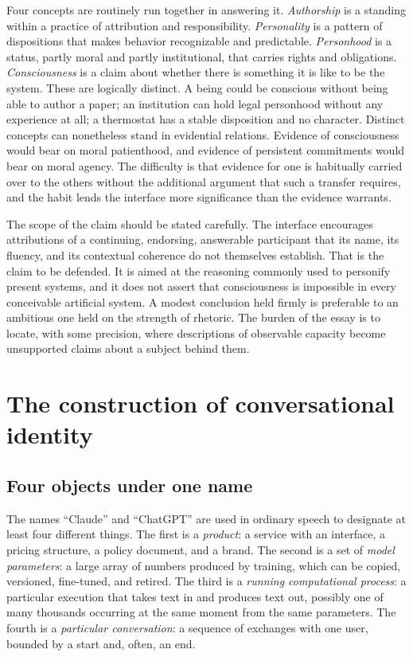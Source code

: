 \documentclass[11pt]{article}
\begin{document}
Four concepts are routinely run together in answering it. \emph{Authorship} is a standing within a practice of attribution and responsibility. \emph{Personality} is a pattern of dispositions that makes behavior recognizable and predictable. \emph{Personhood} is a status, partly moral and partly institutional, that carries rights and obligations. \emph{Consciousness} is a claim about whether there is something it is like to be the system. These are logically distinct. A being could be conscious without being able to author a paper; an institution can hold legal personhood without any experience at all; a thermostat has a stable disposition and no character. Distinct concepts can nonetheless stand in evidential relations. Evidence of consciousness would bear on moral patienthood, and evidence of persistent commitments would bear on moral agency. The difficulty is that evidence for one is habitually carried over to the others without the additional argument that such a transfer requires, and the habit lends the interface more significance than the evidence warrants.

The scope of the claim should be stated carefully. The interface encourages attributions of a continuing, endorsing, answerable participant that its name, its fluency, and its contextual coherence do not themselves establish. That is the claim to be defended. It is aimed at the reasoning commonly used to personify present systems, and it does not assert that consciousness is impossible in every conceivable artificial system. A modest conclusion held firmly is preferable to an ambitious one held on the strength of rhetoric. The burden of the essay is to locate, with some precision, where descriptions of observable capacity become unsupported claims about a subject behind them.

\section{The construction of conversational identity}

\subsection{Four objects under one name}

The names ``Claude'' and ``ChatGPT'' are used in ordinary speech to designate at least four different things. The first is a \emph{product}: a service with an interface, a pricing structure, a policy document, and a brand. The second is a set of \emph{model parameters}: a large array of numbers produced by training, which can be copied, versioned, fine-tuned, and retired. The third is a \emph{running computational process}: a particular execution that takes text in and produces text out, possibly one of many thousands occurring at the same moment from the same parameters. The fourth is a \emph{particular conversation}: a sequence of exchanges with one user, bounded by a start and, often, an end.
\end{document}
